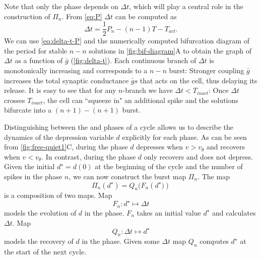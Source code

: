 Note that only the \suppressed{} phase depends on $\Delta t$, which will play a central role in the construction of $\Pi_n$.
From \cref{eq:P} $\Delta t$ can be computed as
\begin{equation}
	\label{eq:delta-t-P}
	\Delta t = \frac{1}{2}P_n - (n-1)T - T_{act}.
\end{equation}
We can use \cref{eq:delta-t-P} and the numerically computed bifurcation diagram of the period for stable $n-n$ solutions in \cref{fig:bif-diagram}A to obtain the graph of $\Delta t$ as a function of $\bar g$ (\cref{fig:delta-t}).
Each continuous branch of $\Delta t$ is monotonically increasing and corresponds to a $n-n$ burst:
Stronger coupling $\bar g$ increases the total synaptic conductance $\bar g s$ that acts on the \suppressed{} cell, thus delaying its release.
It is easy to see that for any $n$-branch we have $\Delta t < T_{inact}$:
Once $\Delta t$ crosses $T_{inact}$, the \free{} cell can ``squeeze in" an additional spike and the solutions bifurcate into a $(n+1)-(n+1)$ burst.

Distinguishing between the \free{} and \suppressed{} phases of a cycle allows us to describe the dynamics of the depression variable $d$ explicitly for each phase.
As can be seen from \cref{fig:free-quiet1}C, during the \free{} phase $d$ depresses when $v > v_\theta$ and recovers when $v < v_\theta$.
In contrast, during the \suppressed{} phase $d$ only recovers and does not depress.
Given the initial $d^{\star} = d(0)$ at the beginning of the cycle and the number of spikes in the \free{} phase $n$, we can now construct the burst map $\Pi_n$.
The map
\begin{equation}
	\Pi_n(d^\star)=Q_n\big(F_n(d^\star\big))
\end{equation}
\noindent
is a composition of two maps. Map
\begin{equation}
	F_n:d^\star\mapsto \Delta t
\end{equation}
models the evolution of $d$ in the \free{} phase.
$F_n$ takes an initial value $d^{\star}$ and calculates $\Delta t$.
Map
\begin{equation}
	Q_n:\Delta t \mapsto d^{\star}
\end{equation}
models the recovery of $d$ in the \suppressed{} phase.
Given some $\Delta t$ map $Q_n$ computes $d^\star$ at the start of the next cycle.

